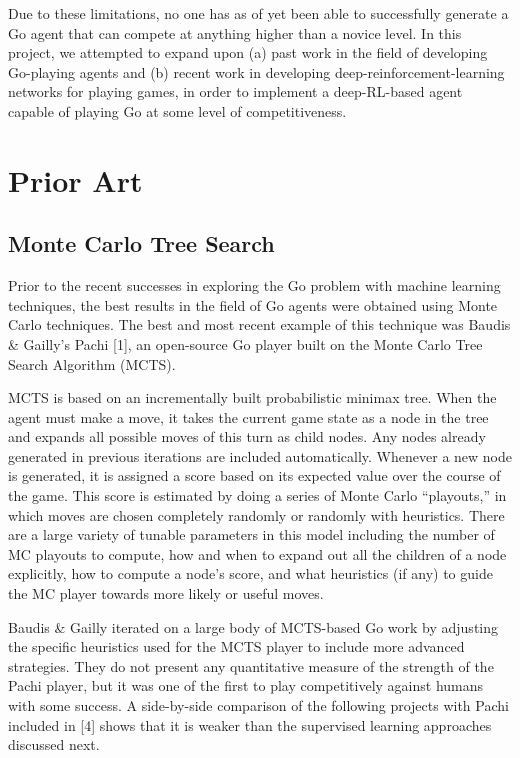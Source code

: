 Due to these limitations, no one has as of yet been able to successfully generate a Go agent that can compete at anything higher than a novice level. In this project, we attempted to expand upon (a) past work in the field of developing Go-playing agents and (b) recent work in developing deep-reinforcement-learning networks for playing games, in order to implement a deep-RL-based agent capable of playing Go at some level of competitiveness.

\section{Prior Art}
\label{gen_inst}

\subsection{Monte Carlo Tree Search}
Prior to the recent successes in exploring the Go problem with machine learning techniques, the best results in the field of Go agents were obtained using Monte Carlo techniques. The best and most recent example of this technique was Baudis \& Gailly's Pachi [1], an open-source Go player built on the Monte Carlo Tree Search Algorithm (MCTS).

MCTS is based on an incrementally built probabilistic minimax tree. When the agent must make a move, it takes the current game state as a node in the tree and expands all possible moves of this turn as child nodes. Any nodes already generated in previous iterations are included automatically. Whenever a new node is generated, it is assigned a score based on its expected value over the course of the game. This score is estimated by doing a series of Monte Carlo ``playouts,'' in which moves are chosen completely randomly or randomly with heuristics. There are a large variety of tunable parameters in this model including the number of MC playouts to compute, how and when to expand out all the children of a node explicitly, how to compute a node's score, and what heuristics (if any) to guide the MC player towards more likely or useful moves.

Baudis \& Gailly iterated on a large body of MCTS-based Go work by adjusting the specific heuristics used for the MCTS player to include more advanced strategies. They do not present any quantitative measure of the strength of the Pachi player, but it was one of the first to play competitively against humans with some success. A side-by-side comparison of the following projects with Pachi included in [4] shows that it is weaker than the supervised learning approaches discussed next.

